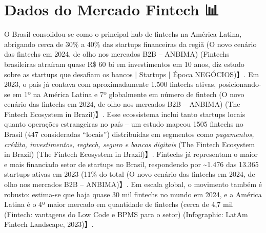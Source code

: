 \documentclass[12pt]{article}
\begin{document}
\section*{Dados do Mercado Fintech 📊}

O Brasil consolidou-se como o principal hub de fintechs na América Latina, abrigando cerca de 30\% a 40\% das startups financeiras da regiã (O novo cenário das fintechs em 2024, de olho nos mercados B2B – ANBIMA) (Fintechs brasileiras atraíram quase R\$ 60 bi em investimentos em 10 anos, diz estudo sobre as startups que desafiam os bancos | Startups | Época NEGÓCIOS)】. Em 2023, o país já contava com aproximadamente 1.500 fintechs ativas, posicionando-se em 1º na América Latina e 7º globalmente em número de fintech (O novo cenário das fintechs em 2024, de olho nos mercados B2B – ANBIMA) (The Fintech Ecosystem in Brazil)】. Esse ecossistema inclui tanto startups locais quanto operações estrangeiras no país – um estudo mapeou 1505 fintechs no Brasil (447 consideradas “locais”) distribuídas em segmentos como \textit{pagamentos, crédito, investimentos, regtech, seguro e bancos digitais} (The Fintech Ecosystem in Brazil) (The Fintech Ecosystem in Brazil)】. Fintechs já representam o maior e mais financiado setor de startups no Brasil, respondendo por \textasciitilde1.476 das 13.365 startups ativas em 2023 (11\% do total (O novo cenário das fintechs em 2024, de olho nos mercados B2B – ANBIMA)】. Em escala global, o movimento também é robusto: estima-se que haja quase 30 mil fintechs no mundo em 2024, e a América Latina é o 4º maior mercado em quantidade de fintechs (cerca de 4,7 mil (Fintech: vantagens do Low Code e BPMS para o setor) (Infographic: LatAm Fintech Landscape, 2023)】.
\end{document}
